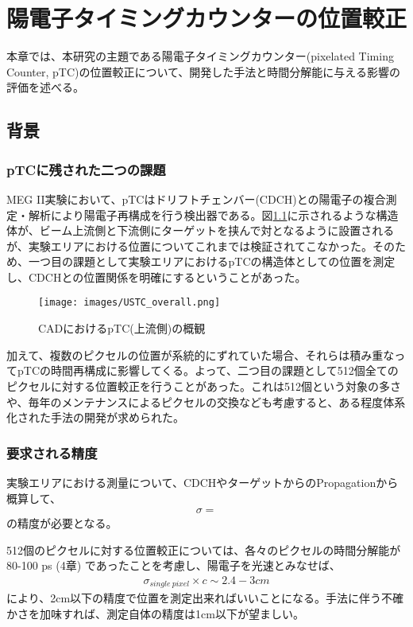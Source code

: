 \documentclass[Yonemoto_master.tex]{subfiles}
\begin{document}
\chapter{陽電子タイミングカウンターの位置較正}
本章では、本研究の主題である陽電子タイミングカウンター(pixelated Timing Counter, pTC)の位置較正について、開発した手法と時間分解能に与える影響の評価を述べる。

\section{背景}
\subsection{pTCに残された二つの課題}
MEG II実験において、pTCはドリフトチェンバー(CDCH)との陽電子の複合測定・解析により陽電子再構成を行う検出器である。図\ref{fig: pTC_CAD}に示されるような構造体が、ビーム上流側と下流側にターゲットを挟んで対となるように設置されるが、実験エリアにおける位置についてこれまでは検証されてこなかった。そのため、一つ目の課題として実験エリアにおけるpTCの構造体としての位置を測定し、CDCHとの位置関係を明確にするということがあった。

\begin{figure}[h]
\begin{center}
\texttt{[image: images/USTC\_overall.png]}
\caption{CADにおけるpTC(上流側)の概観}
\label{fig: pTC_CAD}
\end{center}
\end{figure}

加えて、複数のピクセルの位置が系統的にずれていた場合、それらは積み重なってpTCの時間再構成に影響してくる。よって、二つ目の課題として512個全てのピクセルに対する位置較正を行うことがあった。これは512個という対象の多さや、毎年のメンテナンスによるピクセルの交換なども考慮すると、ある程度体系化された手法の開発が求められた。

\subsection{要求される精度}

実験エリアにおける測量について、CDCHやターゲットからのPropagationから概算して、
\begin{align}
\sigma = 
\end{align}
の精度が必要となる。

512個のピクセルに対する位置較正については、各々のピクセルの時間分解能が80-100 ps (4章) であったことを考慮し、陽電子を光速とみなせば、
\begin{align}
\sigma_{single\ pixel} \times c \sim 2.4 - 3 cm
\end{align}
により、2cm以下の精度で位置を測定出来ればいいことになる。手法に伴う不確かさを加味すれば、測定自体の精度は1cm以下が望ましい。
\end{document}
